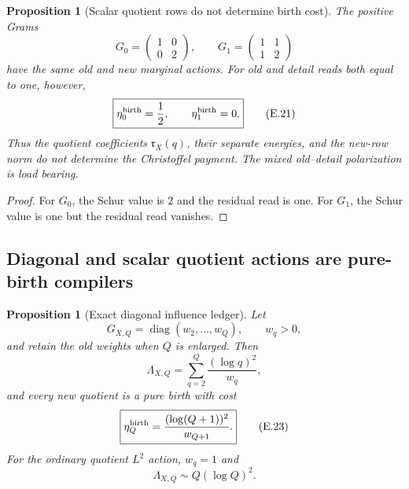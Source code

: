 \documentclass[11pt]{article}
\newtheorem{proposition}[theorem]{Proposition}
\theoremstyle{definition}
\theoremstyle{remark}
\begin{document}
\begin{proposition}[Scalar quotient rows do not determine birth cost]
\label{cth:affend-marginals-no-birth}
The positive Grams
\[
 G_0=\begin{pmatrix}1&0\\0&2\end{pmatrix},
 \qquad
 G_1=\begin{pmatrix}1&1\\1&2\end{pmatrix}
\]
have the same old and new marginal actions.  For old and detail reads both
equal to one, however,
\begin{equation}
 \label{eq:affend-marginals-no-birth}
 \boxed{
 \eta_0^{\rm birth}=\frac12,
 \qquad
 \eta_1^{\rm birth}=0.}
 \tag{E.21}
\end{equation}
Thus the quotient coefficients $\mathfrak r_X(q)$, their separate energies,
and the new-row norm do not determine the Christoffel payment.  The mixed
old--detail polarization is load bearing.
\end{proposition}

\begin{proof}
For $G_0$, the Schur value is $2$ and the residual read is one.  For $G_1$,
the Schur value is one but the residual read vanishes.
\end{proof}

\subsection{Diagonal and scalar quotient actions are pure-birth compilers}
\label{subsec:affend-diagonal-no-go}

\begin{proposition}[Exact diagonal influence ledger]
\label{prop:affend-diagonal-ledger}
Let
\[
 G_{X,Q}=\operatorname{diag}(w_2,\ldots,w_Q),
 \qquad w_q>0,
\]
and retain the old weights when $Q$ is enlarged.  Then
\begin{equation}
 \label{eq:affend-diagonal-influence}
 \boxed{
 \Lambda_{X,Q}
 =\sum_{q=2}^{Q}\frac{(\log q)^2}{w_q},}
 \tag{E.22}
\end{equation}
and every new quotient is a pure birth with cost
\begin{equation}
 \label{eq:affend-diagonal-birth}
 \boxed{
 \eta_Q^{\rm birth}
 =\frac{(\log(Q+1))^2}{w_{Q+1}}.}
 \tag{E.23}
\end{equation}
For the ordinary quotient $L^2$ action, $w_q=1$ and
\[
 \boxed{
 \Lambda_{X,Q}\sim Q(\log Q)^2.}
\]
\end{proposition}
\end{document}
